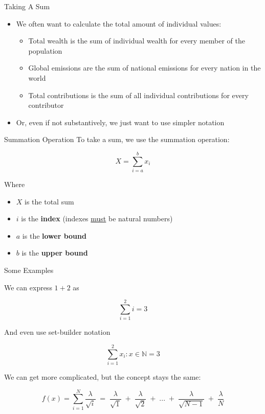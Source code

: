 \documentclass[10pt]{beamer}
\begin{document}
\begin{frame}{Taking A Sum}
    \begin{itemize}
        \item We often want to calculate the total amount of individual values:
        \begin{itemize}
            \item Total wealth is the sum of individual wealth for every member of the population
            \item Global emissions are the sum of national emissions for every nation in the world
            \item Total contributions is the sum of all individual contributions for every contributor
        \end{itemize}
        \item Or, even if not substantively, we just want to use simpler notation
    \end{itemize}
\end{frame}

\begin{frame}{Summation Operation}
    To take a sum, we use the summation operation:

    \[X = \sum_{i=a}^{b} x_i\]

    Where

    \begin{itemize}
        \item $X$ is the total sum
        \item $i$ is the \textbf{index} (indexes \underline{must} be natural numbers)
        \item $a$ is the \textbf{lower bound}
        \item $b$ is the \textbf{upper bound}
    \end{itemize}
\end{frame}

\begin{frame}{Some Examples}

We can express $1+2$ as

\[\sum_{i=1}^2 i = 3 \]

And even use set-builder notation

\[\sum_{i=1}^2 x_i: x \in \mathbb{N} = 3\]

We can get more complicated, but the concept stays the same:

\[f(x) = \sum_{i = 1}^N \frac{\lambda}{\sqrt{i}}\; = \;\frac{\lambda}{\sqrt{1}} \;+ \;\frac{\lambda}{\sqrt{2}}\; +\; ... \;+ \;\frac{\lambda}{\sqrt{N-1}} \;+ \;\frac{\lambda}{N}\]

\end{frame}
\end{document}
